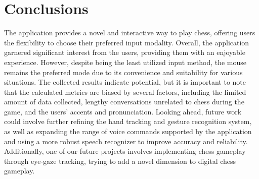 \documentclass[a4paper, 11pt, twocolumn]{IEEEtran}
\begin{document}
    \section{Conclusions} The application provides a novel and interactive way to play chess, offering users the flexibility to choose their preferred input modality. Overall, the application garnered significant interest from the users, providing them with an enjoyable experience. However, despite being the least utilized input method, the mouse remains the preferred mode due to its convenience and suitability for various situations. The collected results indicate potential, but it is important to note that the calculated metrics are biased by several factors, including the limited amount of data collected, lengthy conversations unrelated to chess during the game, and the users' accents and pronunciation. Looking ahead, future work could involve further refining the hand tracking and gesture recognition system, as well as expanding the range of voice commands supported by the application and using a more robust speech recognizer to improve accuracy and reliability. Additionally, one of our future projects involves implementing chess gameplay through eye-gaze tracking, trying to add a novel dimension to digital chess gameplay. 
\end{document}
